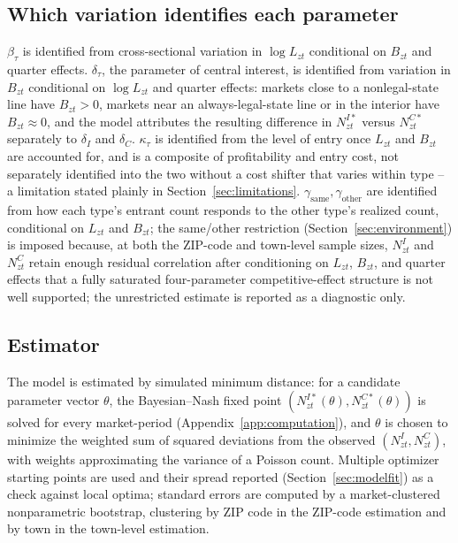 \documentclass[english,12pt]{article}
\begin{document}
\subsection{Which variation identifies each parameter}

$\beta_\tau$ is identified from cross-sectional variation in $\log L_{zt}$ conditional on $B_{zt}$ and quarter effects. $\delta_\tau$, the parameter of central interest, is identified from variation in $B_{zt}$ conditional on $\log L_{zt}$ and quarter effects: markets close to a nonlegal-state line have $B_{zt}>0$, markets near an always-legal-state line or in the interior have $B_{zt}\approx0$, and the model attributes the resulting difference in $N^{I*}_{zt}$ versus $N^{C*}_{zt}$ separately to $\delta_I$ and $\delta_C$. $\kappa_\tau$ is identified from the level of entry once $L_{zt}$ and $B_{zt}$ are accounted for, and is a composite of profitability and entry cost, not separately identified into the two without a cost shifter that varies within type -- a limitation stated plainly in Section~\ref{sec:limitations}. $\gamma_{\text{same}}, \gamma_{\text{other}}$ are identified from how each type's entrant count responds to the other type's realized count, conditional on $L_{zt}$ and $B_{zt}$; the same/other restriction (Section~\ref{sec:environment}) is imposed because, at both the ZIP-code and town-level sample sizes, $N^I_{zt}$ and $N^C_{zt}$ retain enough residual correlation after conditioning on $L_{zt}$, $B_{zt}$, and quarter effects that a fully saturated four-parameter competitive-effect structure is not well supported; the unrestricted estimate is reported as a diagnostic only.

\subsection{Estimator}

The model is estimated by simulated minimum distance: for a candidate parameter vector $\theta$, the Bayesian--Nash fixed point $(N^{I*}_{zt}(\theta), N^{C*}_{zt}(\theta))$ is solved for every market-period (Appendix~\ref{app:computation}), and $\theta$ is chosen to minimize the weighted sum of squared deviations from the observed $(N^I_{zt}, N^C_{zt})$, with weights approximating the variance of a Poisson count. Multiple optimizer starting points are used and their spread reported (Section~\ref{sec:modelfit}) as a check against local optima; standard errors are computed by a market-clustered nonparametric bootstrap, clustering by ZIP code in the ZIP-code estimation and by town in the town-level estimation.
\end{document}
